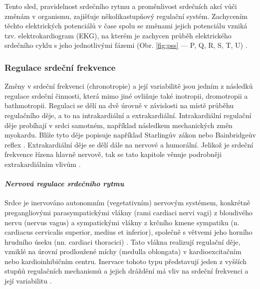 Tento sled, pravidelnost srdečního rytmu a proměnlivost srdečních akcí vůči
změnám v organismu, zajišťuje několikastupňový regulační systém. Zachycením
těchto elektrických potenciálů v čase spolu se změnami jejich potenciálu vzniká
tzv. elektrokardiogram (EKG), na kterém je zachycen průběh elektrického
srdečního cyklu s jeho jednotlivými fázemi (Obr. \ref{fig:pss} --- P, Q, R, S,
T, U) \cite{Dylevsky2013,Cihak2016}.


\subsubsection{Regulace srdeční frekvence}
\label{section:hr_regulation}
Změny v srdeční frekvenci (chronotropie) a její variabilitě jsou jedním z
následků regulace srdeční činnosti, která mimo jiné ovliňuje také inotropii,
dromotropii a bathmotropii. Regulaci se dělí na dvě úrovně v závislosti na místě
průběhu regulačního děje, a to na intrakardiální a extrakardiální.
Intrakardiální regulační děje probíhají v srdci samotném, například následkem
mechanických změn myokardu. Blíže tyto děje popisuje například Starlingův zákon
nebo Bainbridgeův reflex \cite{Kittnar2020}. Extrakardiální děje se dělí dále na
nervové a humorální. Jelikož je srdeční frekvence řízena hlavně nervově, tak se
tato kapitole věnuje podrobněji extrakardiálním vlivům \cite{Orel2019}.

\paragraph*{\textit{Nervová regulace srdečního rytmu}\\} Srdce je inervováno
autonomním (vegetativním) nervovým systémem, konkrétně pregangliovými
parasympatickými vlákny (rami cardiaci nervi vagi) z bloudivého nervu (nervus
vagus) a sympatickými vlákny z krčního kmene sympatiku (n. cardiacus cervicalis
superior, medius et inferior), společně s větvemi jeho horního hrudního úseku
(nn. cardiaci thoracici) \cite{Dylevsky2013,Kittnar2020}. Tato vlákna realizují
regulační děje, vzniklé na úrovní prodloužené míchy (medulla oblongata) v
kardioexcitačním nebo kardioinhibičním centru. Inervace tohoto typu představují
jeden z vyšších stupňů regulačních mechanismů a jejich dráždění má vliv na
srdeční frekvenci a její variabilitu \cite{Dylevsky2013,Trojan2002}.

